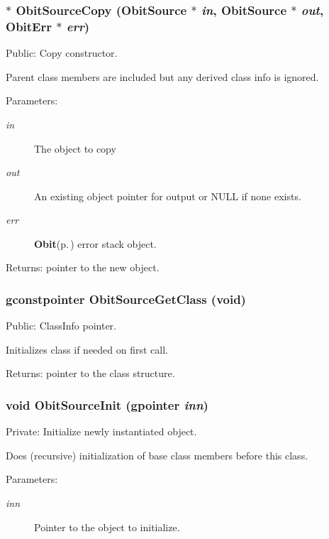 \subsubsection{$\ast$ Obit\-Source\-Copy ({\bf Obit\-Source} $\ast$ {\em in}, {\bf Obit\-Source} $\ast$ {\em out}, {\bf Obit\-Err} $\ast$ {\em err})}\label{ObitSource_8c_a8}


Public: Copy constructor. 

Parent class members are included but any derived class info is ignored. \begin{Desc}
\item[Parameters:]
\begin{description}
\item[{\em in}]The object to copy \item[{\em out}]An existing object pointer for output or NULL if none exists. \item[{\em err}]{\bf Obit}{\rm (p.\,\pageref{structObit})} error stack object. \end{description}
\end{Desc}
\begin{Desc}
\item[Returns:]pointer to the new object. \end{Desc}
\subsubsection{\setlength{\rightskip}{0pt plus 5cm}gconstpointer Obit\-Source\-Get\-Class (void)}\label{ObitSource_8c_a7}


Public: Class\-Info pointer. 

Initializes class if needed on first call. \begin{Desc}
\item[Returns:]pointer to the class structure. \end{Desc}
\subsubsection{\setlength{\rightskip}{0pt plus 5cm}void Obit\-Source\-Init (gpointer {\em inn})}\label{ObitSource_8c_a3}


Private: Initialize newly instantiated object. 

Does (recursive) initialization of base class members before this class. \begin{Desc}
\item[Parameters:]
\begin{description}
\item[{\em inn}]Pointer to the object to initialize. \end{description}
\end{Desc}

